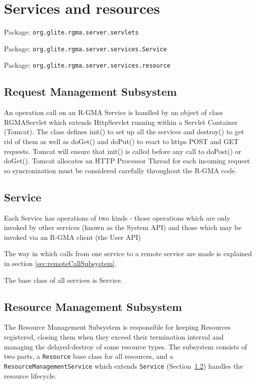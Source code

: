 \section{Services and resources}

Package: \texttt{org.glite.rgma.server.servlets}

Package: \texttt{org.glite.rgma.server.services.Service}

Package: \texttt{org.glite.rgma.server.services.resource}

\subsection{Request Management Subsystem}
\label{sec:requestManagementSubsystem}

An operation call on an R-GMA Service is handled by an object of class
RGMAServlet which extends HttpServlet  running within a Servlet Container
(Tomcat). The class defines init() to set up all the services and destroy() to
get rid of them as well as doGet() and doPut() to react to https POST and GET
requests. Tomcat will ensure that init() is called before any call to doPost() or
doGet(). Tomcat allocates an HTTP Processor Thread for each incoming request so
syncronization must be considered carefully throughout the R-GMA code.

\subsection{Service}
\label{sec:service}

Each Service has operations of two kinds - those operations which are
only invoked by other services (known as the System API) and those
which may be invoked via an R-GMA client (the User API) 

The way in which calls from one service to a remote service are made is
explained in section \ref{sec:remoteCallSubsystem}.

The base class of all services is Service.

\subsection{Resource Management Subsystem}
\label{sec:resourceManagementSubsystem}

The Resource Management Subsystem is responsible for keeping Resources 
registered, closing them when they exceed their termination interval and 
managing the delayed-destroy of some resource types. The subsystem consists of 
two parts, a  \texttt{Resource} base class for all resources, and a
\texttt{ResourceManagementService} 
which extends \texttt{Service} (Section~\ref{sec:service})
handles the resource lifecycle.

